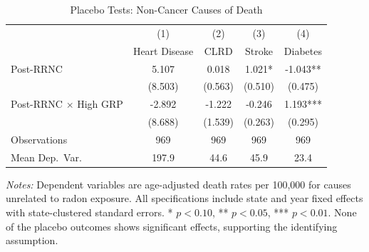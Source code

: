 \begin{table}[H]
\centering
\caption{Placebo Tests: Non-Cancer Causes of Death}
\begin{threeparttable}
\begin{tabular}{lcccc}
\toprule
 & (1) & (2) & (3) & (4) \\
 & Heart Disease & CLRD & Stroke & Diabetes \\
\midrule
Post-RRNC & 5.107 & 0.018 & 1.021* & -1.043** \\
 & (8.503) & (0.563) & (0.510) & (0.475) \\
Post-RRNC $\times$ High GRP & -2.892 & -1.222 & -0.246 & 1.193*** \\
 & (8.688) & (1.539) & (0.263) & (0.295) \\
\midrule
Observations & 969 & 969 & 969 & 969 \\
Mean Dep.~Var. & 197.9 & 44.6 & 45.9 & 23.4 \\
\bottomrule
\end{tabular}
\begin{tablenotes}[flushleft]
\small
\item \textit{Notes:} Dependent variables are age-adjusted death rates per 100,000 for causes unrelated to radon exposure. All specifications include state and year fixed effects with state-clustered standard errors. * $p<0.10$, ** $p<0.05$, *** $p<0.01$. None of the placebo outcomes shows significant effects, supporting the identifying assumption.
\end{tablenotes}
\end{threeparttable}
\label{tab:placebo}
\end{table}
